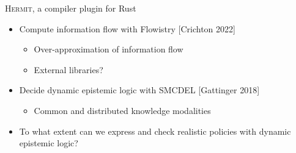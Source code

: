 \documentclass[14pt, aspectratio=169, xcolor={dvipsnames}]{beamer}
\begin{document}
\begin{frame}{\textsc{Hermit}, a compiler plugin for Rust}
  \begin{itemize}
    \item Compute information flow with Flowistry
      {\hfill\small\color{black!80} [Crichton 2022]}

      \begin{itemize}
        \item Over-approximation of information flow
        \item External libraries?
      \end{itemize}

    \pause
    \item Decide dynamic epistemic logic with SMCDEL
      {\hfill\small\color{black!80} [Gattinger 2018]}

      \begin{itemize}
        \item Common and distributed knowledge modalities
      \end{itemize}

    \pause
    \item To what extent can we express and check realistic policies with dynamic epistemic logic?
  \end{itemize}
\end{frame}
\end{document}
